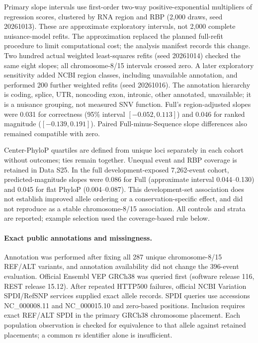 Primary slope intervals use first-order two-way positive-exponential multipliers of regression scores, clustered by RNA region and RBP (2,000 draws, seed 20261013). These are approximate exploratory intervals, not 2,000 complete nuisance-model refits. The approximation replaced the planned full-refit procedure to limit computational cost; the analysis manifest records this change. Two hundred actual weighted least-squares refits (seed 20261014) checked the same eight slopes; all chromosome-8/15 intervals crossed zero. A later exploratory sensitivity added NCBI region classes, including unavailable annotation, and performed 200 further weighted refits (seed 20261016). The annotation hierarchy is coding, splice, UTR, noncoding exon, intronic, other annotated, unavailable; it is a nuisance grouping, not measured SNV function. Full's region-adjusted slopes were 0.031 for correctness (95\% interval $[-0.052,0.113]$) and 0.046 for ranked magnitude ($[-0.139,0.191]$). Paired Full-minus-Sequence slope differences also remained compatible with zero.

Center-PhyloP quartiles are defined from unique loci separately in each cohort without outcomes; ties remain together. Unequal event and RBP coverage is retained in Data S25. In the full development-exposed 7,262-event cohort, predicted-magnitude slopes were 0.086 for Full (approximate interval 0.044--0.130) and 0.045 for flat PhyloP (0.004--0.087). This development-set association does not establish improved allele ordering or a conservation-specific effect, and did not reproduce as a stable chromosome-8/15 association. All controls and strata are reported; example selection used the coverage-based rule below.

\paragraph{Exact public annotations and missingness.} Annotation was performed after fixing all 287 unique chromosome-8/15 REF/ALT variants, and annotation availability did not change the 396-event evaluation. Official Ensembl VEP GRCh38 was queried first (software release 116, REST release 15.12). After repeated HTTP500 failures, official NCBI Variation SPDI/RefSNP services supplied exact allele records. SPDI queries use accessions NC\_000008.11 and NC\_000015.10 and zero-based positions. Inclusion requires exact REF/ALT SPDI in the primary GRCh38 chromosome placement. Each population observation is checked for equivalence to that allele against retained placements; a common rs identifier alone is insufficient.

